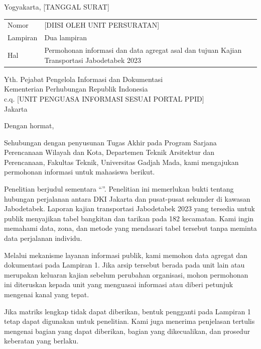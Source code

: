 \documentclass[12pt]{article}
\begin{document}
\KopSurat

\begin{flushright}
Yogyakarta, [TANGGAL SURAT]
\end{flushright}

\begin{tabularx}{\textwidth}{@{}P{0.20\textwidth}Y@{}}
  Nomor & [DIISI OLEH UNIT PERSURATAN] \\
  Lampiran & Dua lampiran \\
  Hal & Permohonan informasi dan data agregat asal dan tujuan Kajian Transportasi Jabodetabek 2023
\end{tabularx}

Yth. Pejabat Pengelola Informasi dan Dokumentasi\\
Kementerian Perhubungan Republik Indonesia\\
c.q. [UNIT PENGUASA INFORMASI SESUAI PORTAL PPID]\\
Jakarta

Dengan hormat,

Sehubungan dengan penyusunan Tugas Akhir pada Program Sarjana Perencanaan Wilayah dan Kota, Departemen Teknik Arsitektur dan Perencanaan, Fakultas Teknik, Universitas Gadjah Mada, kami mengajukan permohonan informasi untuk mahasiswa berikut.

\IdentitasMahasiswa

Penelitian berjudul sementara ``\JudulSementara''. Penelitian ini memerlukan bukti tentang hubungan perjalanan antara DKI Jakarta dan pusat-pusat sekunder di kawasan Jabodetabek. Laporan kajian transportasi Jabodetabek 2023 yang tersedia untuk publik menyajikan tabel bangkitan dan tarikan pada 182 kecamatan. Kami ingin memahami data, zona, dan metode yang mendasari tabel tersebut tanpa meminta data perjalanan individu.

Melalui mekanisme layanan informasi publik, kami memohon data agregat dan dokumentasi pada Lampiran 1. Jika arsip tersebut berada pada unit lain atau merupakan keluaran kajian sebelum perubahan organisasi, mohon permohonan ini diteruskan kepada unit yang menguasai informasi atau diberi petunjuk mengenai kanal yang tepat.

\PernyataanPenggunaanData

\PernyataanTanpaBiaya

Jika matriks lengkap tidak dapat diberikan, bentuk pengganti pada Lampiran 1 tetap dapat digunakan untuk penelitian. Kami juga menerima penjelasan tertulis mengenai bagian yang dapat diberikan, bagian yang dikecualikan, dan prosedur keberatan yang berlaku.
\end{document}
